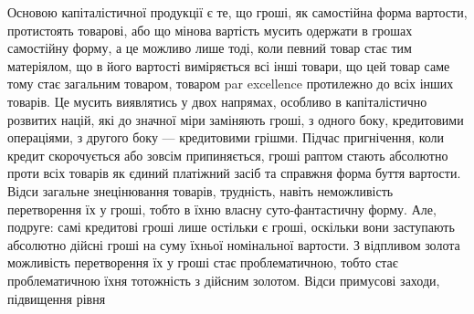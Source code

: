 Основою капіталістичної продукції є те, що гроші, як самостійна форма вартости,
протистоять товарові, або що мінова вартість мусить одержати в грошах
самостійну форму, а це можливо лише тоді, коли певний товар стає тим матеріялом,
що в його вартості виміряється всі інші товари, що цей товар саме тому
стає загальним товаром, товаром par excellence протилежно до всіх інших товарів.
Це мусить виявлятись у двох напрямах, особливо в капіталістично розвитих
націй, які до значної міри заміняють гроші, з одного боку, кредитовими операціями,
з другого боку — кредитовими грішми. Підчас пригнічення, коли кредит
скорочується або зовсім припиняється, гроші раптом стають абсолютно проти
всіх товарів як єдиний платіжний засіб та справжня форма буття вартости.
Відси загальне знецінювання товарів, трудність, навіть неможливість перетворення
їх у гроші, тобто в їхню власну суто-фантастичну форму. Але, подруге: самі
кредитові гроші лише остільки є гроші, оскільки вони заступають абсолютно
дійсні гроші на суму їхньої номінальної вартости. З відпливом золота можливість
перетворення їх у гроші стає проблематичною, тобто стає проблематичною
їхня тотожність з дійсним золотом. Відси примусові заходи, підвищення рівня
\parbreak{}  %
